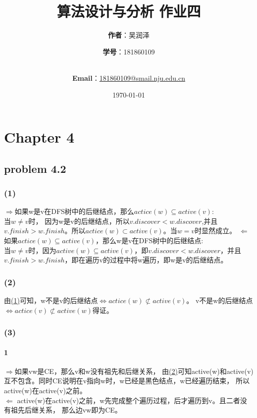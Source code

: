 \documentclass[11pt,a4paper,oneside,oldfontcommands]{ctexart}
\title{\Huge\textbf{算法设计与分析 作业四}\\}
\author{\Large\textbf{作者}：吴润泽 \and{\Large\textbf{学号}：181860109}\\
	\\
	\and {\Large\textbf{Email}：\href{mailto:181860109@smail.nju.edu.cn}{181860109@smail.nju.edu.cn}}\\}
\date{\Large\today}
\begin{document}
\maketitle
\newpage
\tableofcontents
\cleardoublepage
\section*{Chapter 4}
{\subsection*{problem 4.2}}
\hypertarget{(1)}{\subsubsection*{(1)}}
\textbf{$\Rightarrow$}如果w是v在DFS树中的后继结点，那么$actice(w)\subseteq active(v)$:\\
当$w\ne v$时，
因为w是v的后继结点，所以$v.discover<w.discover$,并且$v.finish>w.finish$。所以$actice(w)\subset active(v)$。当$w=v$时显然成立。
\textbf{$\Leftarrow$}如果$actice(w)\subseteq active(v)$，那么w是v在DFS树中的后继结点:\\
当$w\ne v$时，因为$active(w)\subseteq active(v)$，即$v.discover<w.discover$，并且$v.finish>w.finish$，即在遍历v的过程中将w遍历，即w是v的后继结点。
\hypertarget{(2)}{\subsubsection*{(2)}}
由\hyperref[(1)]{(1)}可知，w不是v的后继结点$\Leftrightarrow actice(w)\not\subset active(v)$。
v不是w的后继结点$\Leftrightarrow actice(v)\not\subset active(w)$得证。
\subsubsection*{(3)}
\paragraph*{\textcircled{1}}
\textbf{$\Rightarrow$}如果vw是CE，那么v和w没有祖先和后继关系，
由\hyperref[(2)]{(2)}可知active(w)和active(v)互不包含。同时CE说明在v指向w时，w已经是黑色结点，w已经遍历结束，
所以active(w)在active(v)之前。\\
\hspace*{20pt}\textbf{$\Leftarrow$ }active(w)在active(v)之前，w先完成整个遍历过程，后才遍历到v。且二者没有祖先后继关系，
那么边vw即为CE。\\
\end{document}
